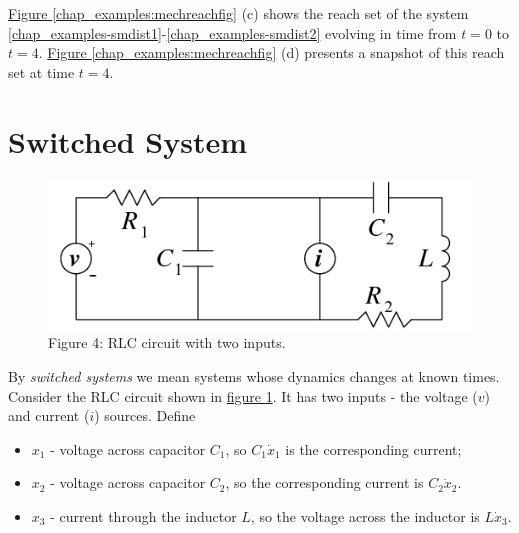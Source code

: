\documentclass[letterpaper,10pt,english]{sphinxmanual}
\begin{document}
\hyperref[chap_examples:mechreachfig]{Figure  \ref*{chap_examples:mechreachfig}} (c) shows the reach set of the system
\eqref{chap_examples-smdist1}-\eqref{chap_examples-smdist2} evolving in time from \(t=0\) to \(t=4\).
\hyperref[chap_examples:mechreachfig]{Figure  \ref*{chap_examples:mechreachfig}} (d) presents a snapshot of this reach set at time
\(t=4\).


\section{Switched System}
\label{chap_examples:switched-system}\begin{figure}[htbp]
\centering
\capstart

\includegraphics[width=0.300\linewidth]{chapter06_section03_rlc.png}
\caption{Figure 4: RLC circuit with two inputs.}\label{chap_examples:rlcfig}\end{figure}

By \emph{switched systems} we mean systems whose dynamics changes at known
times. Consider the RLC circuit shown in \hyperref[chap_examples:rlcfig]{figure  \ref*{chap_examples:rlcfig}}. It has two
inputs - the voltage (\(v\)) and current (\(i\)) sources. Define
\begin{itemize}
\item {} 
\(x_1\) - voltage across capacitor \(C_1\), so
\(C_1\dot{x}_1\) is the corresponding current;

\item {} 
\(x_2\) - voltage across capacitor \(C_2\), so the
corresponding current is \(C_2\dot{x}_2\).

\item {} 
\(x_3\) - current through the inductor \(L\), so the voltage
across the inductor is \(L\dot{x}_3\).

\end{itemize}
\end{document}
